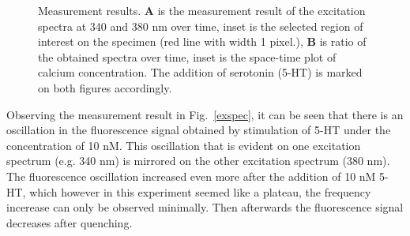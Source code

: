 \begin{figure}[ht]
\centering
{} \hfil
{}
\caption{Measurement results. \textbf{A} is the measurement result of the excitation spectra at 340 and 380 nm over time, inset is the selected region of interest on the specimen (red line with width 1 pixel.), \textbf{B} is ratio of the obtained spectra over time, inset is the space-time plot of calcium concentration. 
The addition of serotonin (5-HT) is marked on both figures accordingly.} 
\label{fig:CaIm}
\end{figure}

Observing the measurement result in Fig.~\ref{exspec}, it can be seen that there is an oscillation in the fluorescence signal obtained by stimulation of 5-HT under the concentration of 10 nM. 
This oscillation that is evident on one excitation spectrum (e.g. 340 nm) is mirrored on the other excitation spectrum (380 nm). 
The fluorescence oscillation increased even more after the addition of 10 nM 5-HT, which however in this experiment seemed like a plateau, the frequency incerease can only be observed minimally. 
Then afterwards the fluorescence signal decreases after quenching.

